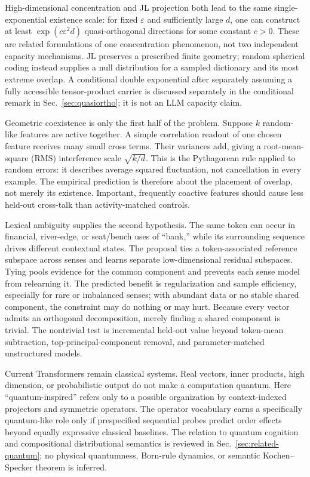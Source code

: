 \documentclass[
  aps,
  reprint,
  superscriptaddress,
  floatfix,
  nofootinbib,
  longbibliography
]{revtex4-2}
\begin{document}
High-dimensional concentration and JL projection both lead to the same
single-exponential existence scale: for fixed $\varepsilon$ and sufficiently
large $d$, one can construct at least
$\exp(c\varepsilon^2d)$ quasi-orthogonal directions for some constant $c>0$.
These are related formulations of one concentration phenomenon, not two
independent capacity mechanisms.  JL preserves a prescribed finite geometry;
random spherical coding instead supplies a null distribution for a sampled
dictionary and its most extreme overlap.  A conditional double exponential
after separately assuming a fully accessible tensor-product carrier is
discussed separately in the conditional remark in
Sec.~\ref{sec:quasiortho}; it is not an LLM capacity
claim.

Geometric coexistence is only the first half of the problem.  Suppose $k$
random-like features are active together.  A simple correlation readout of one
chosen feature receives many small cross terms.  Their variances add, giving a
root-mean-square (RMS) interference scale $\sqrt{k/d}$.  This is the
Pythagorean rule applied to random errors: it describes average squared
fluctuation, not cancellation in every example.  The empirical prediction is
therefore about the placement of overlap, not merely its existence.  Important,
frequently coactive features should cause less held-out cross-talk than
activity-matched controls.

Lexical ambiguity supplies the second hypothesis.  The same token can occur in
financial, river-edge, or seat/bench uses of ``bank,'' while its surrounding
sequence drives different contextual states.  The proposal ties a
token-associated reference subspace across senses and learns separate
low-dimensional residual subspaces.  Tying pools evidence for the common
component and prevents each sense model from relearning it.  The predicted
benefit is regularization and sample efficiency, especially for rare or
imbalanced senses; with abundant data or no stable shared component, the
constraint may do nothing or may hurt.  Because every vector admits an
orthogonal decomposition, merely finding a shared component is trivial.  The
nontrivial test is incremental held-out value beyond token-mean subtraction,
top-principal-component removal, and parameter-matched unstructured models.

Current Transformers remain classical systems.  Real vectors, inner products,
high dimension, or probabilistic output do not make a computation quantum.
Here ``quantum-inspired'' refers only to a possible organization by
context-indexed projectors and symmetric operators.  The operator vocabulary
earns a specifically quantum-like role only if prespecified sequential probes
predict order effects beyond equally expressive classical baselines.  The
relation to quantum cognition and compositional distributional semantics is
reviewed in Sec.~\ref{sec:related-quantum}; no physical quantumness, Born-rule
dynamics, or semantic Kochen--Specker theorem is inferred.
\end{document}

